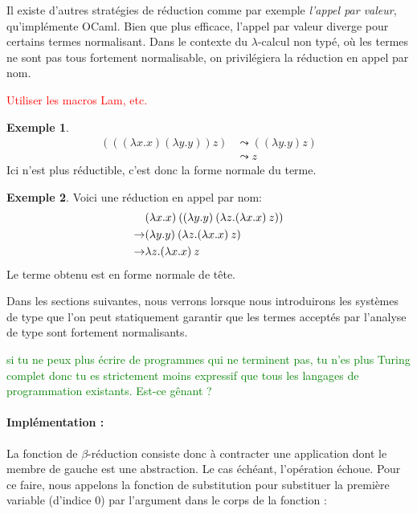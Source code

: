 \documentclass {article}
\newcommand{\codefrom}[3]
           {}
\theoremstyle{definition}
\newtheorem{example}{Exemple}
\theoremstyle{remark}
\newcommand{\todo}[1]{\textcolor{red}{#1}}
\newcommand{\question}[1]{\textcolor{green}{#1}}
\begin{document}
Il existe d'autres stratégies de réduction comme par exemple
\emph{l'appel par valeur}, qu'implémente OCaml. Bien que plus
efficace, l'appel par valeur diverge pour certains termes normalisant.
Dans le contexte du \(\lambda\)-calcul non typé, où les termes ne sont
pas tous fortement normalisable, on privilégiera la réduction en appel
par nom.

\todo{Utiliser les macros Lam, etc.}
\begin{example}
  \begin{align*}
    (((\lambda x.x) (\lambda y.y)) z) &\leadsto ((\lambda y.y) z) \\
    & \leadsto z
  \end{align*}
  Ici  n'est plus réductible, c'est donc la forme normale du terme.
\end{example}


\begin{example}
  Voici une réduction en appel par nom:
  \begin{align*}
    & (\lambda x. x)\:({(\lambda y. y)\:({\lambda z. (\lambda x. x)\:z}})) \\
    \rightarrow & (\lambda y. y)\:({\lambda z. (\lambda x. x)\:z})\\
    \rightarrow & \lambda z. (\lambda x. x)\:z
  \end{align*}
  Le terme obtenu est en forme normale de tête.
\end{example}

Dans les sections suivantes, nous verrons lorsque nous introduirons
les systèmes de type que l'on peut statiquement garantir que les
termes acceptés par l'analyse de type sont fortement normalisants.

\question{si tu ne peux plus écrire de
  programmes qui ne terminent pas, tu n'es plus Turing complet donc tu
  es strictement moins expressif que tous les langages de
  programmation existants. Est-ce gênant ?}


\paragraph{Implémentation :}
La fonction de $\beta$-réduction consiste donc à contracter une
application dont le membre de gauche est une abstraction. Le cas
échéant, l'opération échoue. Pour ce faire, nous appelons la fonction
de substitution pour substituer la première variable (d'indice \(0\))
par l'argument dans le corps de la fonction :
%
\codefrom{untyped}{lambda}{reduction}
\end{document}
